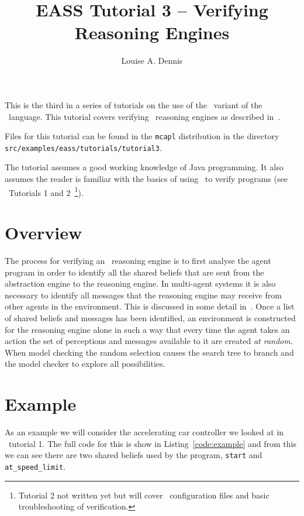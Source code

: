 \documentclass[a4]{article}
\author{Louise A. Dennis}
\title{EASS Tutorial 3 -- Verifying Reasoning Engines}
\begin{document}
\maketitle
This is the third in a series of tutorials on the use of the \eass\ variant of the \gwendolen\ language.  This tutorial covers verifying \eass\ reasoning engines as described in~\cite{dennis14:_pract,DBLP:journals/cacm/FisherDW13}.

Files for this tutorial can be found in the \texttt{mcapl} distribution in the directory \texttt{src/examples/eass/tutorials/tutorial3}.

The tutorial assumes a good working knowledge of Java programming.  It also assumes the reader is familiar with the basics of using \ajpf\ to verify programs (see \ajpf\ Tutorials 1 and 2~\footnote{Tutorial 2 not written yet but will cover \jpf\ configuration files and basic troubleshooting of verification.}).

\section{Overview}
The process for verifying an \eass\ reasoning engine is to first analyse the agent program in order to identify all the shared beliefs that are sent from the abstraction engine to the reasoning engine.  In multi-agent systems it is also necessary to identify all messages that the reasoning engine may receive from other agents in the environment.  This is discussed in some detail in~\cite{dennis14:_pract}.  Once a list of shared beliefs and messages has been identified, an environment is constructed for the reasoning engine alone in such a way that every time the agent takes an action the set of perceptions and messages available to it are created \emph{at random}.  When model checking the random selection causes the search tree to branch and the model checker to explore all possibilities.

\section{Example}
As an example we will consider the accelerating car controller we looked at in \eass\ tutorial 1.  The full code for this is show in Listing~\ref{code:example} and from this we can see there are two shared beliefs used by the program, \lstinline{start} and \lstinline{at_speed_limit}.
\end{document}
